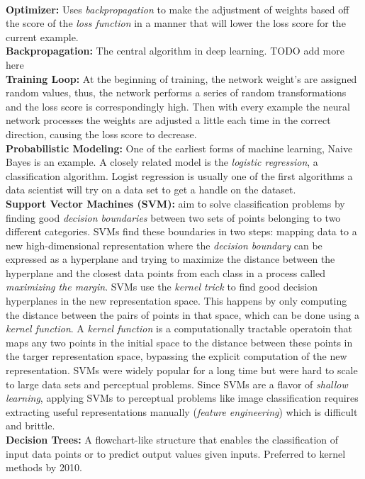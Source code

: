 {  \\ \textbf{Optimizer:} Uses \emph{backpropagation} to make the adjustment of weights based off the score of the \emph{loss function} in a manner that will lower the loss score for the current example.
  \\ \textbf{Backpropagation:} The central algorithm in deep learning. TODO add more here
  \\ \textbf{Training Loop:} At the beginning of training, the network weight's are assigned random values, thus, the network performs a series of random transformations and the loss score is correspondingly high.
  Then with every example the neural network processes the weights are adjusted a little each time in the correct direction, causing the loss score to decrease.
  \\ \textbf{Probabilistic Modeling:} One of the earliest forms of machine learning, Naive Bayes is an example. A closely related model is the \emph{logistic regression}, a classification algorithm. Logist regression is
  usually one of the first algorithms a data scientist will try on a data set to get a handle on the dataset.
  \\ \textbf{Support Vector Machines (SVM):} aim to solve classification problems by finding good \emph{decision boundaries} between two sets of points belonging to two different categories. SVMs find these boundaries in two steps: mapping data to a
  new high-dimensional representation where the \emph{decision boundary} can be expressed as a hyperplane and trying to maximize the distance between the hyperplane and the closest data points from each class in a process called
  \emph{maximizing the margin}. SVMs use the \emph{kernel trick} to find good decision hyperplanes in the new representation space. This happens by only computing the distance between the pairs of points in that space, which can be done using a \emph{kernel function}.
  A \emph{kernel function} is a computationally tractable operatoin that maps any two points in the initial space to the distance between these points in the targer representation space, bypassing the explicit computation of the new representation. SVMs were widely popular
  for a long time but were hard to scale to large data sets and perceptual problems. Since SVMs are a flavor of \emph{shallow learning}, applying SVMs to perceptual problems like image classification requires extracting useful representations manually (\emph{feature engineering}) which
  is difficult and brittle.
  \\ \textbf{Decision Trees:} A flowchart-like structure that enables the classification of input data points or to predict output values given inputs. Preferred to kernel methods by 2010.
}
